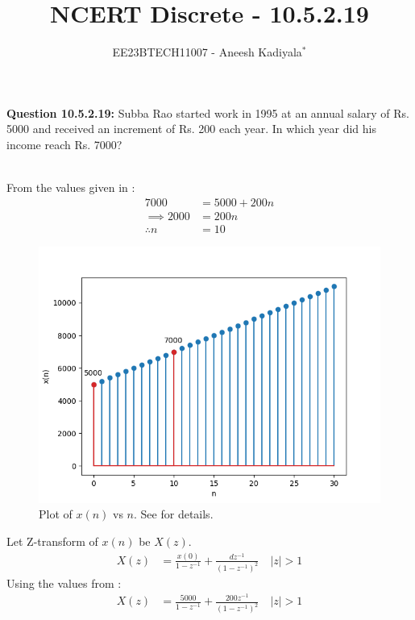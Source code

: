 \documentclass[journal,12pt,twocolumn]{IEEEtran}
\theoremstyle{remark}
\begin{document}

\vspace{3cm}

\title{NCERT Discrete - 10.5.2.19}
\author{EE23BTECH11007 - Aneesh Kadiyala$^{*}$%
}
\maketitle
\newpage
\bigskip

\renewcommand{\thefigure}{\theenumi}
\renewcommand{\thetable}{\theenumi}
\vspace{3cm}
\textbf{Question 10.5.2.19:} Subba Rao started work in 1995 at an annual salary of Rs. 5000 and received an increment of Rs. 200 each year. In which year did his income reach Rs. 7000?

\solution
 \\
From the values given in :
\begin{align}
7000 &= 5000 + 200n \\
\implies 2000 &= 200n \\
\therefore n &= 10
\end{align}
\begin{figure}[h!]
    \centering
    \includegraphics[width=\columnwidth]{figs/10_5_2_19.png}
    \caption{Plot of $x(n)$ vs $n$. See  for details.}
    \label{fig:1}
\end{figure}
Let Z-transform of $x(n)$ be $X(z)$.
\begin{align}
X(z) &= \frac{x(0)}{1 - z^{-1}} + \frac{dz^{-1}}{(1 - z^{-1})^2} \quad |z| > 1
\end{align}
Using the values from :
\begin{align}
X(z) &= \frac{5000}{1 - z^{-1}} + \frac{200z^{-1}}{(1 - z^{-1})^2} \quad |z| > 1
\end{align}
\end{document}
